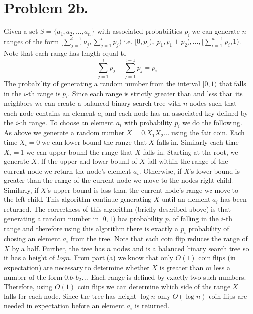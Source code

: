\documentclass[12pt]{article}
\begin{document}
\section*{Problem 2b.}
Given a set $S = \{a_1,a_2,...,a_n\}$ with associated probabilities $p_i$ we can
generate $n$ ranges of the form
$[\sum^{i-1}_{j=1} p_j, \sum^i_{j=1} p_j)$ i.e.
$[0,p_1), [p_1, p_1 + p_2),..., [\sum^{n-1}_{i=1} p_i, 1)$.
Note that each range has length equal to
$$\sum^i_{j=1} p_j - \sum^{i-1}_{j=1} p_j = p_i$$
The probability of generating a random number from the interval
$[0,1)$ that falls in the $i$-th range is $p_i$. Since each range is strictly
greater than and less than its neighbors we can create a balanced binary search tree
with $n$ nodes such that each node contains an element $a_i$ and each node has
an associated key defined by the $i$-th range. To choose an element $a_i$
with probability $p_i$ we do the following. As above we generate a random number
$X = 0.X_1X_2...$ using the fair coin. Each time $X_i = 0$ we can lower bound
the range that $X$ falls in. Similarly each time $X_i = 1$ we can upper bound
the range that $X$ falls in. Starting at the root, we generate $X$. If the
upper and lower bound of $X$ fall within the range of the current node
we return the node's element $a_i$. Otherwise, if $X$'s lower bound is greater
than the range of the current node we move to the nodes right child. Similarly,
if $X$'s upper bound is less than the current node's range we move to the left
child. This algorithm continue generating $X$ until an element $a_i$ has been
returned. The correctness of this algorithm (briefly described above) is that
generating a random number in $[0,1)$ has probability $p_i$ of falling in the
$i$-th range and therefore using this algorithm there is exactly a $p_i$
probability of chosing an element $a_i$ from the tree. Note that each coin flip
reduces the range of $X$ by a half. Further, the tree has $n$ nodes and is a
balanced binary search tree so it has a height of $log n$. From part (a) we
know that only $O(1)$ coin flips (in expectation) are necessary to determine
whether $X$ is greater than or less a number of the form $0.b_1b_2...$. Each
range is defined by exactly two such numbers. Therefore, using $O(1)$ coin flips
we can determine which side of the range $X$ falls for each node. Since the tree
has height $\log n$ only $O(\log n)$ coin flips are needed in expectation
before an element $a_i$ is returned.
\end{document}
